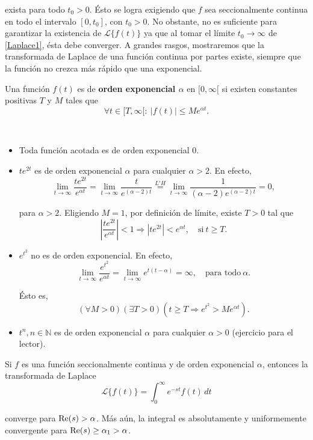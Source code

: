 exista para todo $t_0 > 0$. Ésto se logra exigiendo que $f$ sea seccionalmente continua en todo el intervalo $[0,t_0]$, con $t_0>0$. No obstante, no es suficiente para garantizar la existencia de $\mathcal{L}\{f(t)\}$ ya que al tomar el límite $t_0 \to \infty$ de \eqref{Laplace1}, ésta debe converger. A grandes rasgos, mostraremos que la transformada de Laplace de una función continua por partes existe, siempre que la función no crezca más rápido que una exponencial.

\begin{defi}
    Una función $f(t)$ es de \textbf{orden exponencial $\alpha$} en $[0,\infty[$ si existen constantes positivas $T$ y $M$ tales que
    $$\forall t \in [T, \infty[: ~ |f(t)| \leq M e^{\alpha t}.$$
\end{defi}

\begin{ejemplo}
\ 

    \begin{itemize}
        \item Toda función acotada es de orden exponencial 0.

        \item $t e^{2t}$ es de orden exponencial $\alpha$ para cualquier $\alpha > 2$. En efecto,
        $$\lim_{t \to \infty} \frac{t e^{2t}}{e^{\alpha t}} = \lim_{t \to \infty} \frac{t}{e^{(\alpha-2) t}} \overset{L'H}{=} \lim_{t \to \infty} \frac{1}{(\alpha -2 )e^{(\alpha-2) t}} = 0,$$

        para $\alpha > 2$. Eligiendo $M = 1$, por definición de límite, existe $T > 0$ tal que 
        $$\left|\frac{t e^{2t}}{e^{\alpha t}} \right| < 1 \Rightarrow |te^{2t}| < e^{\alpha t}, \quad \text{si} ~ t \geq T.$$
        
        \item $e^{t^2}$ no es de orden exponencial. En efecto,
        $$\lim_{t \to  \infty} \frac{e^{t^2}}{e^{\alpha t}} = \lim_{t \to \infty} e^{t(t-\alpha)} = \infty, \quad \mbox{para todo} ~ \alpha.$$

        Ésto es,
        $$(\forall M >0)(\exists T >0)\left(t \geq T \Rightarrow e^{t^2} > M e^{\alpha t}\right).$$

        \item $t^n, n \in \mathbb{N}$ es de orden exponencial $\alpha$ para cualquier $\alpha > 0$ (ejercicio para el lector).
    \end{itemize}
\end{ejemplo}

\begin{teorema}[de existencia] \label{ExistenciaLaplace}
Si $f$ es una función seccionalmente continua y de orden exponencial $\alpha$, entonces la transformada de Laplace
$$\mathcal{L}\{f(t)\} = \int_0^{\infty} e^{-st} f(t) \,dt$$

converge para $\operatorname{Re}(s) > \alpha$. Más aún, la integral es absolutamente y uniformemente convergente para $\operatorname{Re}(s) \geq \alpha_1 >  \alpha$.
\end{teorema}

